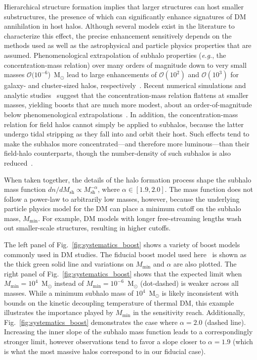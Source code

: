 Hierarchical structure formation implies that larger structures can host smaller substructures, the presence of which can significantly enhance signatures of DM annihilation in host halos. Although several models exist in the literature to characterize this effect, the precise enhancement sensitively depends on the methods used as well as the astrophysical and particle physics properties that are assumed.  Phenomenological extrapolation of subhalo properties (\emph{e.g.}, the concentration-mass relation) over many orders of magnitude down to very small masses $\mathcal O(10^{-6}$)~M$_{\odot}$ lead to large enhancements of $\mathcal O(10^{2})$ and $\mathcal O(10^{3})$ for galaxy- and cluster-sized halos, respectively~\cite{Gao:2011rf}. Recent numerical simulations and analytic studies~\cite{Anderhalden:2013wd,Correa:2015dva,Ludlow:2013vxa} suggest that the concentration-mass relation flattens at smaller masses, yielding boosts that are much more modest, about an order-of-magnitude below phenomenological extrapolations~\cite{Nezri:2012tu,Sanchez-Conde:2013yxa}.  In addition, the concentration-mass relation for field halos cannot simply be applied to subhalos, because the latter undergo tidal stripping as they fall into and orbit their host.  Such effects tend to make the subhalos more concentrated---and therefore more luminous---than their field-halo counterparts, though the number-density of such subhalos is also reduced~\cite{Bartels:2015uba}.    

When taken together, the details of the halo formation process shape the subhalo mass function $dn/dM_\text{sh}\propto M_\text{sh}^{-\alpha}$, where $\alpha  \in \left[1.9, 2.0\right]$.  The mass function does not follow a power-law to arbitrarily low masses, however, because the underlying particle physics model for the DM can place a minimum cutoff on the subhalo mass, $M_\text{min}$.  For example, DM models with longer free-streaming lengths wash out smaller-scale structures, resulting in higher cutoffs.

The left panel of Fig.~\ref{fig:systematics_boost} shows a variety of boost models commonly used in DM studies. The fiducial boost model used here~\cite{Bartels:2015uba} is shown as the thick green solid line and variations on $M_\text{min}$ and $\alpha$ are also plotted. The right panel of Fig.~\ref{fig:systematics_boost} shows that the expected limit when $M_\text{min} = 10^4$~M$_\odot$ instead of $M_\text{min} = 10^{-6}$~M$_\odot$ (dot-dashed) is weaker across all masses.  While a minimum subhalo mass of  $10^{4}$~M$_\odot$ is likely inconsistent with bounds on the kinetic decoupling temperature of thermal DM, this example illustrates the importance played by $M_\text{min}$ in the sensitivity reach.  Additionally, Fig.~\ref{fig:systematics_boost} demonstrates the case where $\alpha=2.0$ (dashed line).  Increasing the inner slope of the subhalo mass function leads to a correspondingly stronger limit, however observations tend to favor a slope closer to $\alpha = 1.9$ (which is what the most massive halos correspond to in our fiducial case).

